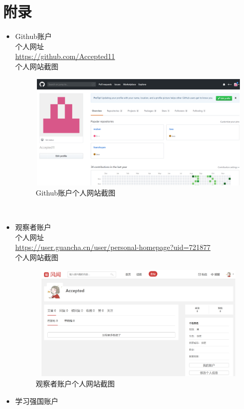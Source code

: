 \documentclass{article}
\begin{document}
\newpage
\section{附录}
\begin{itemize}
    \item Github账户\\
          个人网址\\
          \url{https://github.com/Accepted11}\\
          个人网站截图
          \begin{figure}[h!]
                \centering
                \includegraphics[width=12.5cm,height=5.5cm]{1.png}
                \caption{Github账户个人网站截图}
                \label{fig:universe}
            \end{figure}\\
    \item 观察者账户\\
          个人网址\\
          \url{https://user.guancha.cn/user/personal-homepage?uid=721877}\\
          个人网站截图
          \begin{figure}[h!]
                \centering
                \includegraphics[width=12.5cm,height=5.5cm]{2.png}
                \caption{观察者账户个人网站截图}
                \label{fig:universe}
            \end{figure}
    \newpage
    \item 学习强国账户\\

\end{itemize}
\end{document}
